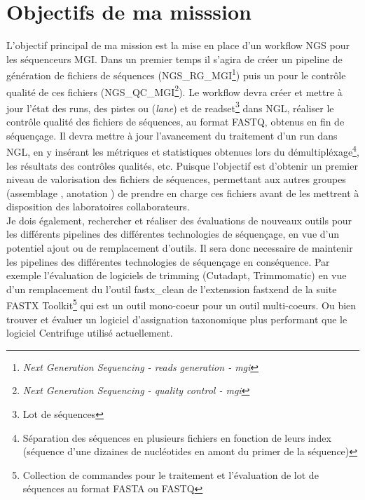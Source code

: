 \section{Objectifs de ma misssion}
L'objectif principal de ma mission est la mise en place d'un workflow NGS pour les séquenceurs MGI. Dans un premier temps il s'agira de créer un pipeline de génération de fichiers de séquences (NGS\_RG\_MGI\footnote{\emph{Next Generation Sequencing - reads generation - mgi}}) puis un pour le contrôle qualité de ces fichiers (NGS\_QC\_MGI\footnote{\emph{Next Generation Sequencing - quality control - mgi}}). Le workflow devra créer et mettre à jour l'état des runs, des pistes ou (\emph{lane}) et de readset\footnote{Lot de séquences} dans NGL, réaliser le contrôle qualité des fichiers de séquences, au format FASTQ, obtenus en fin de séquençage. Il devra mettre à jour l'avancement du traitement d'un run dans NGL, en y insérant les métriques et statistiques obtenues lors du démultipléxage\footnote{Séparation des séquences en plusieurs fichiers en fonction de leurs index (séquence d'une dizaines de nucléotides en amont du primer de la séquence)}, les résultats des contrôles qualités, etc. Puisque l'objectif est d'obtenir un premier niveau de valorisation des fichiers de séquences, permettant aux autres groupes (\og assemblage \fg{}, \og anotation \fg{}) de prendre en charge ces fichiers avant de les mettrent à disposition des laboratoires collaborateurs.\\

Je dois également, rechercher et réaliser des évaluations de nouveaux outils pour les différents pipelines des différentes technologies de séquençage, en vue d'un potentiel ajout ou de remplacement d'outils. Il sera donc necessaire de maintenir les pipelines des différentes technologies de séquençage en conséquence. Par exemple l'évaluation de logiciels de trimming (Cutadapt, Trimmomatic) en vue d'un remplacement du l'outil fastx\_clean de l'extenssion fastxend de la suite FASTX Toolkit\footnote{Collection de commandes pour le traitement et l'évaluation de lot de séquences au format FASTA ou FASTQ} qui est un outil mono-coeur pour un outil multi-coeurs. Ou bien trouver et évaluer un logiciel d'assignation taxonomique plus performant que le logiciel Centrifuge utilisé actuellement.